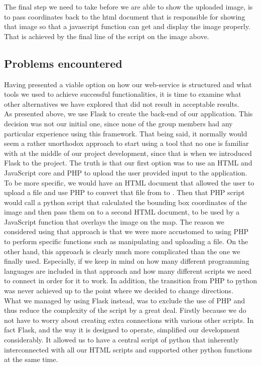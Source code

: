The final step we need to take before we are able to show the uploaded image, is to pass coordinates back to the html document that is responsible for showing that image so that a javascript function can get and display the image properly. That is achieved by the final line of the script on the image above.

\subsection{Problems encountered}
Having presented a viable option on how our web-service is structured and what tools we used to achieve successful functionalities, it is time to examine what other alternatives we have explored that did not result in acceptable results.\\
As presented above, we use Flask to create the back-end of our application. This decision was not our initial one, since none of the group members  had any particular experience using this framework. That being said, it normally would seem a rather unorthodox approach to start using a tool that no one is familiar with at the middle of our project development, since that is when we introduced Flask to the project. The truth is that our first option was to use an HTML and JavaScript core and PHP to upload the user provided input to the application. To be more specific, we would have an HTML document that allowed the user to upload a file and use PHP to convert that file from  to . Then that PHP script would call a python script that calculated the bounding box coordinates of the image and then pass them on to a second HTML document, to be used by a JavaScript function that overlays the image on the map. The reason we considered using that approach is that we were more accustomed to using PHP to perform specific functions such as manipulating and uploading a file. On the other hand, this approach is clearly much more complicated than the one we finally used. Especially, if we keep in mind on how many different programming languages are included in that approach and how many different scripts we need to connect in order for it to work.  In addition, the transition from PHP to python was never achieved up to the point where we decided to change directions.\\

What we managed by using Flask instead, was to exclude the use of PHP and thus reduce the complexity of the script by a great deal. Firstly because we do not have to worry about creating extra connections with various other scripts. In fact Flask, and the way it is designed to operate, simplified our development considerably. It allowed us to have a central script of python that inherently interconnected with all our HTML scripts and supported other python functions at the same time.

